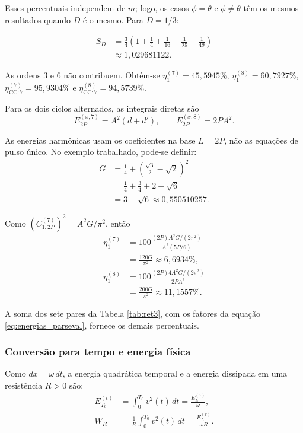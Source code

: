 Esses percentuais independem de $m$; logo, os casos $\phi=\theta$ e
$\phi\neq\theta$ têm os mesmos resultados quando $D$ é o mesmo.
Para $D=1/3$:

\begin{equation}
    \begin{aligned}
        S_D&=\frac34\left(1+\frac14+\frac1{16}+\frac1{25}+\frac1{49}\right) \\
            &\approx1{,}029681122.
    \end{aligned}
\end{equation}

As ordens 3 e 6 não contribuem. Obtêm-se
$\eta_1^{(7)}=45{,}5945\%$, $\eta_1^{(8)}=60{,}7927\%$,
$\eta_{\mathrm{CC}:7}^{(7)}=95{,}9304\%$ e
$\eta_{\mathrm{CC}:7}^{(8)}=94{,}5739\%$.

Para os dois ciclos alternados, as integrais diretas são
\begin{equation}
    E_{2P}^{(x,7)}=A^2(d+d'), \qquad E_{2P}^{(x,8)}=2PA^2.
\end{equation}

As energias harmônicas usam os coeficientes na base $L=2P$,
não as equações de pulso único. No exemplo trabalhado, pode-se definir:
\begin{equation}
    \begin{aligned}
        G&=\frac14+\left(\frac{\sqrt3}{2}-\sqrt2\right)^2 \\
         &=\frac14+\frac34+2-\sqrt6 \\
         &=3-\sqrt6\approx0{,}550510257.
    \end{aligned}
    \label{eq:G_alternada}
\end{equation}

Como $(C_{1,2P}^{(7)})^2=A^2G/\pi^2$, então
\begin{equation}
    \begin{aligned}
        \eta_1^{(7)}&=100\frac{(2P)A^2G/(2\pi^2)}{A^2(5P/6)} \\
            &=\frac{120G}{\pi^2}\approx6{,}6934\%, \\
        \eta_1^{(8)}&=100\frac{(2P)4A^2G/(2\pi^2)}{2PA^2} \\
            &=\frac{200G}{\pi^2}\approx11{,}1557\%.
    \end{aligned}
\end{equation}

A soma dos sete pares da Tabela \ref{tab:ret3}, com os fatores da
equação \ref{eq:energias_parseval}, fornece os demais percentuais.

\subsubsection{Conversão para tempo e energia física}
Como $dx=\omega\,dt$, a energia quadrática temporal e a energia
dissipada em uma resistência $R>0$ são:
\begin{equation}
    \begin{aligned}
        E_{T_0}^{(t)}&=\int_0^{T_0}v^2(t)\,dt
            =\frac{E_L^{(x)}}{\omega}, \\
        W_R&=\frac1R\int_0^{T_0}v^2(t)\,dt
            =\frac{E_L^{(x)}}{\omega R}.
    \end{aligned}
\end{equation}

